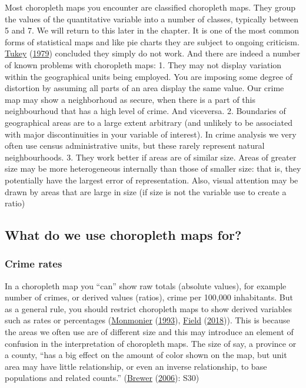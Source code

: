 \documentclass[
]{book}
\begin{document}
Most choropleth maps you encounter are classified choropleth maps. They group the values of the quantitative variable into a number of classes, typically between 5 and 7. We will return to this later in the chapter. It is one of the most common forms of statistical maps and like pie charts they are subject to ongoing criticism. \protect\hyperlink{ref-Tukey_1979}{Tukey} (\protect\hyperlink{ref-Tukey_1979}{1979}) concluded they simply do not work. And there are indeed a number of known problems with choropleth maps:
1. They may not display variation within the geographical units being employed. You are imposing some degree of distortion by assuming all parts of an area display the same value. Our crime map may show a neighborhoud as secure, when there is a part of this neighbourhoud that has a high level of crime. And viceversa.
2. Boundaries of geographical areas are to a large extent arbitrary (and unlikely to be associated with major discontinuities in your variable of interest). In crime analysis we very often use census administrative units, but these rarely represent natural neighbourhoods.
3. They work better if areas are of similar size. Areas of greater size may be more heterogeneous internally than those of smaller size: that is, they potentially have the largest error of representation. Also, visual attention may be drawn by areas that are large in size (if size is not the variable use to create a ratio)

\hypertarget{what-do-we-use-choropleth-maps-for}{%
\subsection{What do we use choropleth maps for?}\label{what-do-we-use-choropleth-maps-for}}

\hypertarget{crime-rates}{%
\subsubsection{Crime rates}\label{crime-rates}}

In a choropleth map you ``can'' show raw totals (absolute values), for example number of crimes, or derived values (ratios), crime per 100,000 inhabitants. But as a general rule, you should restrict choropleth maps to show derived variables such as rates or percentages (\protect\hyperlink{ref-Monmonier_1993}{Monmonier} (\protect\hyperlink{ref-Monmonier_1993}{1993}), \protect\hyperlink{ref-Field_2018}{Field} (\protect\hyperlink{ref-Field_2018}{2018})). This is because the areas we often use are of different size and this may introduce an element of confusion in the interpretation of choropleth maps. The size of say, a province or a county, ``has a big effect on the amount of color shown on the map, but unit area may have little relationship, or even an inverse relationship, to base populations and related counts.'' (\protect\hyperlink{ref-Brewer_2006}{Brewer} (\protect\hyperlink{ref-Brewer_2006}{2006}): S30)
\end{document}
